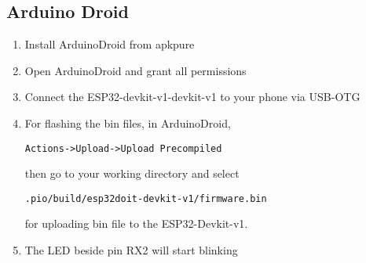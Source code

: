 \subsection{Arduino Droid}
\begin{enumerate}[label=\arabic*.,ref=\theenumi]
\item Install ArduinoDroid from apkpure
\item Open ArduinoDroid and grant all permissions
\item Connect the ESP32-devkit-v1-devkit-v1 to your phone via USB-OTG
\item For flashing the bin files, in ArduinoDroid,
\begin{lstlisting}
Actions->Upload->Upload Precompiled
\end{lstlisting}
then go to your working directory and select
\begin{lstlisting}
.pio/build/esp32doit-devkit-v1/firmware.bin
\end{lstlisting}
for uploading bin file to the ESP32-Devkit-v1.
\item The LED beside pin RX2 will start
blinking
\end{enumerate}




